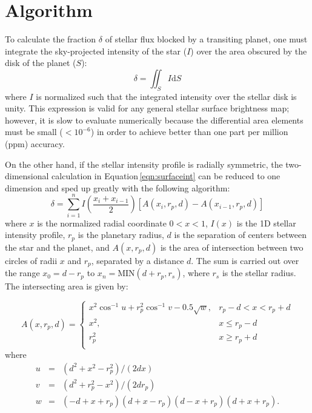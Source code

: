 \documentclass[12pt,preprint]{aastex}
\begin{document}
 


\section{Algorithm}
\label{section:algorithm}
To calculate the fraction $\delta$ of stellar flux blocked by a transiting planet, one must integrate the sky-projected intensity of the star ($I$) over the area obscured by the disk of the planet ($S$):
\begin{equation}
\delta = \iint_S{I \mathrm{d}S}
\label{eqn:surfaceint}
\end{equation}
where $I$ is normalized such that the integrated intensity over the stellar disk is unity. This expression is valid for any general stellar surface brightness map; however, it is slow to evaluate numerically because the differential area elements must be small ($<10^{-6}$) in order to achieve better than one part per million (ppm) accuracy.

On the other hand, if the stellar intensity profile is radially symmetric, the two-dimensional calculation in Equation\,\ref{eqn:surfaceint} can be reduced to one dimension and sped up greatly with the following algorithm: 
\begin{equation}
\delta = \sum_{i=1}^{n} I\left(\frac{x_i+x_{i-1}}{2}\right) \left[A(x_{i}, r_p, d) - A(x_{i-1}, r_p, d)\right]
\end{equation}
where $x$ is the normalized radial coordinate $0 < x < 1$, $I(x)$ is the 1D stellar intensity profile, $r_p$ is the planetary radius, $d$ is the separation of centers between the star and the planet, and $A(x, r_p, d)$ is the area of intersection between two circles of radii $x$ and $r_p$, separated by a distance $d$.  The sum is carried out over the range $x_0 = d - r_p$ to $x_n = \textrm{MIN}(d + r_p, r_s)$, where $r_s$ is the stellar radius.  The intersecting area is given by:

\begin{equation}
A(x, r_p, d) = 
\begin{cases}
x^2\cos^{-1}{u} + r_p^2\cos^{-1}{v} - 0.5\sqrt{w}, & r_p -d < x < r_p + d\\
x^2, & x \le r_p - d\\
r_p^2 & x \ge r_p +d \\
\end{cases}
\end{equation}
where
\begin{eqnarray}
u &=& (d^2+x^2-r_p^2)/(2dx)\\
v &=& (d^2 + r_p^2 -x^2)/(2dr_p) \\
w &=& (-d+x+r_p)(d+x-r_p)(d-x+r_p)(d+x+r_p).
\end{eqnarray}
\end{document}

